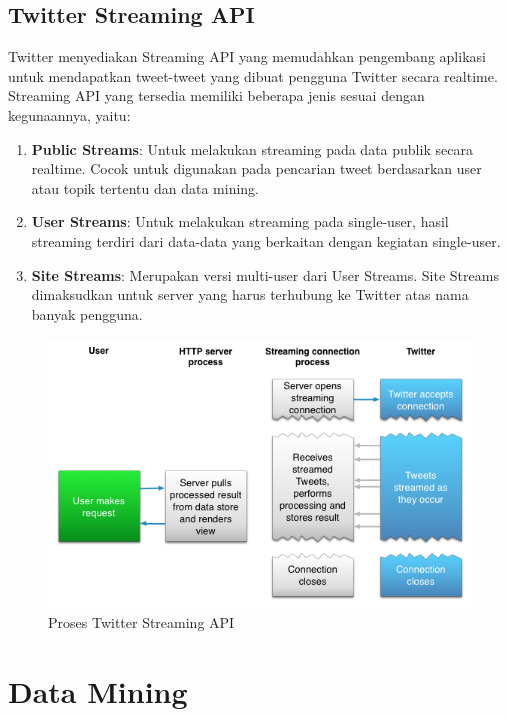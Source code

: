 \subsection{Twitter Streaming API}
\label{sec:twitter_streaming_api}
Twitter menyediakan Streaming API yang memudahkan pengembang aplikasi untuk mendapatkan tweet-tweet yang dibuat pengguna Twitter secara realtime. Streaming API yang tersedia memiliki beberapa jenis sesuai dengan kegunaannya, yaitu:

\begin{enumerate}
	\item \textbf{Public Streams}: Untuk melakukan streaming pada data publik secara realtime. Cocok untuk digunakan pada pencarian tweet berdasarkan user atau topik tertentu dan data mining.
	\item \textbf{User Streams}: Untuk melakukan streaming pada single-user, hasil streaming terdiri dari data-data yang berkaitan dengan kegiatan single-user.
	\item	\textbf{Site Streams}: Merupakan versi multi-user dari User Streams. Site Streams dimaksudkan untuk server yang harus terhubung ke Twitter atas nama banyak pengguna.
\end{enumerate}

\begin{figure}
\centering
\includegraphics[scale=0.5]{Gambar/streaming-intro-2_1.png}
\caption[Proses Twitter Streaming API]{Proses Twitter Streaming API \cite{TwitterApi:2015}} 
\end{figure}

\section{Data Mining}
\label{sec:data_mining}
